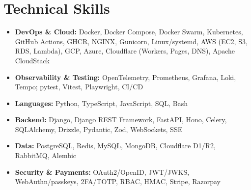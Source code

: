 \documentclass[11pt,a4paper]{article}
\begin{document}
\section{Technical Skills}
\begin{itemize}
  \item \textbf{DevOps \& Cloud:} Docker, Docker Compose, Docker Swarm, Kubernetes, GitHub Actions, GHCR, NGINX, Gunicorn, Linux/systemd, AWS (EC2, S3, RDS, Lambda), GCP, Azure, Cloudflare (Workers, Pages, DNS), Apache CloudStack
  \item \textbf{Observability \& Testing:} OpenTelemetry, Prometheus, Grafana, Loki, Tempo; pytest, Vitest, Playwright, CI/CD
  \item \textbf{Languages:} Python, TypeScript, JavaScript, SQL, Bash
  \item \textbf{Backend:} Django, Django REST Framework, FastAPI, Hono, Celery, SQLAlchemy, Drizzle, Pydantic, Zod, WebSockets, SSE
  \item \textbf{Data:} PostgreSQL, Redis, MySQL, MongoDB, Cloudflare D1/R2, RabbitMQ, Alembic
  \item \textbf{Security \& Payments:} OAuth2/OpenID, JWT/JWKS, WebAuthn/passkeys, 2FA/TOTP, RBAC, HMAC, Stripe, Razorpay
\end{itemize}
\end{document}
